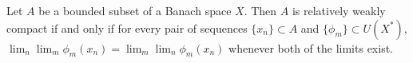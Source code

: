 Let $A$ be a bounded subset of a Banach space $X$. Then $A$ is relatively weakly compact if and only if for every pair of sequences $\{x_n\} \subset A$ and $\{\phi_m\} \subset U(X^*)$, $\lim_n \lim_m \phi_m(x_n) = \lim_m \lim_n \phi_m(x_n)$ whenever both of the limits exist.